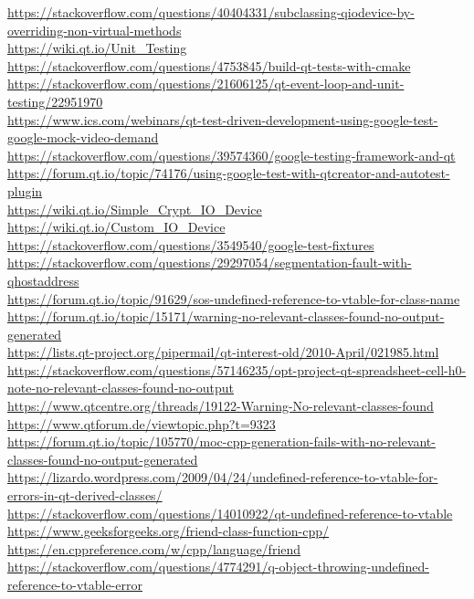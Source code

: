 \documentclass{article}
\begin{document}
    \url{https://stackoverflow.com/questions/40404331/subclassing-qiodevice-by-overriding-non-virtual-methods}\\
    \url{https://wiki.qt.io/Unit\_Testing}\\
    \url{https://stackoverflow.com/questions/4753845/build-qt-tests-with-cmake}\\
    \url{https://stackoverflow.com/questions/21606125/qt-event-loop-and-unit-testing/22951970}\\
    \url{https://www.ics.com/webinars/qt-test-driven-development-using-google-test-google-mock-video-demand}\\
    \url{https://stackoverflow.com/questions/39574360/google-testing-framework-and-qt}\\
    \url{https://forum.qt.io/topic/74176/using-google-test-with-qtcreator-and-autotest-plugin}\\
    \url{https://wiki.qt.io/Simple\_Crypt\_IO\_Device}\\
    \url{https://wiki.qt.io/Custom\_IO\_Device}\\
    \url{https://stackoverflow.com/questions/3549540/google-test-fixtures}\\
    \url{https://stackoverflow.com/questions/29297054/segmentation-fault-with-qhostaddress}\\
    \url{https://forum.qt.io/topic/91629/sos-undefined-reference-to-vtable-for-class-name}\\
    \url{https://forum.qt.io/topic/15171/warning-no-relevant-classes-found-no-output-generated}\\
    \url{https://lists.qt-project.org/pipermail/qt-interest-old/2010-April/021985.html}\\
    \url{https://stackoverflow.com/questions/57146235/opt-project-qt-spreadsheet-cell-h0-note-no-relevant-classes-found-no-output}\\
    \url{https://www.qtcentre.org/threads/19122-Warning-No-relevant-classes-found}\\
    \url{https://www.qtforum.de/viewtopic.php?t=9323}\\
    \url{https://forum.qt.io/topic/105770/moc-cpp-generation-fails-with-no-relevant-classes-found-no-output-generated}\\
    \url{https://lizardo.wordpress.com/2009/04/24/undefined-reference-to-vtable-for-errors-in-qt-derived-classes/}\\
    \url{https://stackoverflow.com/questions/14010922/qt-undefined-reference-to-vtable}\\
    \url{https://www.geeksforgeeks.org/friend-class-function-cpp/}\\
    \url{https://en.cppreference.com/w/cpp/language/friend}\\
    \url{https://stackoverflow.com/questions/4774291/q-object-throwing-undefined-reference-to-vtable-error}
\end{document}
